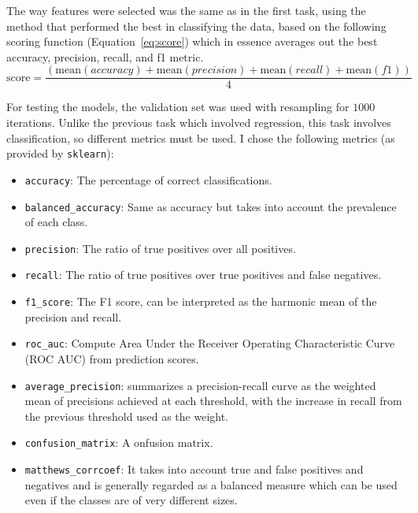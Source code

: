 \documentclass[12pt]{article}
\begin{document}
The way features were selected was the same as in the first task, using the method
that performed the best in classifying the data, based on the following scoring
function (Equation~\ref{eq:score}) which in essence averages out the best accuracy,
precision, recall, and f1 metric.
\begin{equation}    
\text{score} = \frac{
    (\text{mean}(accuracy) + \text{mean}(precision) + \text{mean}(recall) + \text{mean}(f1))
    }{
    4
    }
    \label{eq:score}
\end{equation}

For testing the models, the validation set was used with resampling for $1000$
iterations. Unlike the previous task which involved regression, this task involves
classification, so different metrics must be used. I chose the following metrics
(as provided by \texttt{sklearn}):
\begin{itemize}    
    \item \texttt{accuracy}: The percentage of correct classifications.
    \item \texttt{balanced\_accuracy}: Same as accuracy but takes into account the
    prevalence of each class.
    \item \texttt{precision}: The ratio of true positives over all positives.
    \item \texttt{recall}: The ratio of true positives over true positives and false
    negatives.
    \item \texttt{f1\_score}: The F1 score, can be interpreted as the harmonic
    mean of the precision and recall.
    \item \texttt{roc\_auc}: Compute Area Under the Receiver Operating Characteristic
    Curve (ROC AUC) from prediction scores.
    \item \texttt{average\_precision}: summarizes a precision-recall curve as the
    weighted mean of precisions achieved at each threshold, with the increase in
    recall from the previous threshold used as the weight.
    \item \texttt{confusion\_matrix}: A onfusion matrix.
    \item \texttt{matthews\_corrcoef}: It takes into account true and false positives
    and negatives and is generally regarded as a balanced measure which can be used
    even if the classes are of very different sizes.
\end{itemize}



\end{document}
